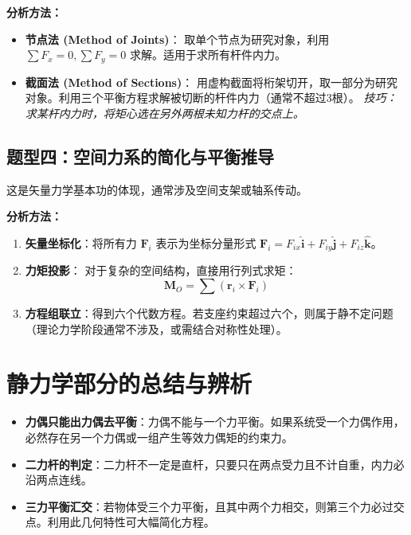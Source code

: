 \documentclass[12pt,a4paper]{article}
\newcommand{\vect}[1]{\mathbf{#1}}                   %
\newcommand{\unitv}[1]{\hat{\mathbf{#1}}}            %
\begin{document}
\textbf{分析方法：}
\begin{itemize}
    \item \textbf{节点法 (Method of Joints)}：
    取单个节点为研究对象，利用 $\sum F_x = 0, \sum F_y = 0$ 求解。适用于求所有杆件内力。
    \item \textbf{截面法 (Method of Sections)}：
    用虚构截面将桁架切开，取一部分为研究对象。利用三个平衡方程求解被切断的杆件内力（通常不超过3根）。
    \textit{技巧：求某杆内力时，将矩心选在另外两根未知力杆的交点上。}
\end{itemize}

\subsection{题型四：空间力系的简化与平衡推导}
这是矢量力学基本功的体现，通常涉及空间支架或轴系传动。

\textbf{分析方法：}
\begin{enumerate}
    \item \textbf{矢量坐标化}：将所有力 $\vect{F}_i$ 表示为坐标分量形式 $\vect{F}_i = F_{ix}\unitv{i} + F_{iy}\unitv{j} + F_{iz}\unitv{k}$。
    \item \textbf{力矩投影}：
    对于复杂的空间结构，直接用行列式求矩：
    \begin{equation}
        \vect{M}_O = \sum (\vect{r}_i \times \vect{F}_i)
    \end{equation}
    \item \textbf{方程组联立}：得到六个代数方程。若支座约束超过六个，则属于静不定问题（理论力学阶段通常不涉及，或需结合对称性处理）。
\end{enumerate}



\section{静力学部分的总结与辨析}

\begin{tcolorbox}[colback=green!5!white, colframe=green!50!black, title=解题避坑指南]
    \begin{itemize}
        \item \textbf{力偶只能出力偶去平衡}：力偶不能与一个力平衡。如果系统受一个力偶作用，必然存在另一个力偶或一组产生等效力偶矩的约束力。
        \item \textbf{二力杆的判定}：二力杆不一定是直杆，只要只在两点受力且不计自重，内力必沿两点连线。
        \item \textbf{三力平衡汇交}：若物体受三个力平衡，且其中两个力相交，则第三个力必过交点。利用此几何特性可大幅简化方程。
    \end{itemize}
\end{tcolorbox}
\end{document}

